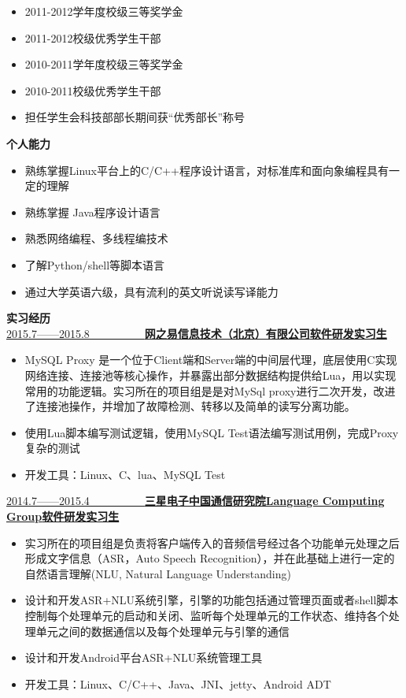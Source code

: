 \documentclass[UTF8, winfonts]{ctexart}
\begin{document}
\begin{itemize}
  \setlength{\itemsep}{0pt}
  \setlength{\parsep}{3pt}
  \setlength{\parskip}{3pt}
  \item {}2011-2012学年度校级三等奖学金
  \item {}2011-2012校级优秀学生干部
  \item {}2010-2011学年度校级三等奖学金
  \item {}2010-2011校级优秀学生干部
  \item {}担任学生会科技部部长期间获“优秀部长”称号
\end{itemize}
\noindent \textbf{ \heiti 个人能力}
\begin{itemize}
  \setlength{\itemsep}{0pt}
  \setlength{\parsep}{3pt}
  \setlength{\parskip}{3pt}
  \item {}熟练掌握Linux平台上的C/C++程序设计语言，对标准库和面向象编程具有一定的理解
  \item {}熟练掌握 Java程序设计语言
  \item {}熟悉网络编程、多线程编技术
  \item {}了解Python/shell等脚本语言
  \item {}通过大学英语六级，具有流利的英文听说读写译能力
\end{itemize}
\noindent \textbf{ \heiti 实习经历}\\
\uline{2015.7——2015.8~~~~~~~~~~\bf{网之易信息技术（北京）有限公司}\hfill \bf{软件研发实习生}}
\begin{itemize}
  \setlength{\itemsep}{0pt}
  \setlength{\parsep}{3pt}
  \setlength{\parskip}{3pt}
  \item {}MySQL Proxy 是一个位于Client端和Server端的中间层代理，底层使用C实现网络连接、连接池等核心操作，并暴露出部分数据结构提供给Lua，用以实现常用的功能逻辑。实习所在的项目组是是对MySql proxy进行二次开发，改进了连接池操作，并增加了故障检测、转移以及简单的读写分离功能。
  \item {}使用Lua脚本编写测试逻辑，使用MySQL Test语法编写测试用例，完成Proxy复杂的测试
  \item {}开发工具：Linux、C、lua、MySQL Test
\end{itemize}
\uline{2014.7——2015.4~~~~~~~~~~\bf{三星电子中国通信研究院Language Computing Group}\hfill \bf{软件研发实习生}}
\begin{itemize}
  \setlength{\itemsep}{0pt}
  \setlength{\parsep}{3pt}
  \setlength{\parskip}{3pt}
  \item {}实习所在的项目组是负责将客户端传入的音频信号经过各个功能单元处理之后形成文字信息（ASR，Auto Speech Recognition），并在此基础上进行一定的自然语言理解(NLU, Natural Language Understanding)
  \item {}设计和开发ASR+NLU系统引擎，引擎的功能包括通过管理页面或者shell脚本控制每个处理单元的启动和关闭、监听每个处理单元的工作状态、维持各个处理单元之间的数据通信以及每个处理单元与引擎的通信
  \item {}设计和开发Android平台ASR+NLU系统管理工具
  \item {}开发工具：Linux、C/C++、Java、JNI、jetty、Android ADT
\end{itemize}
\end{document}
